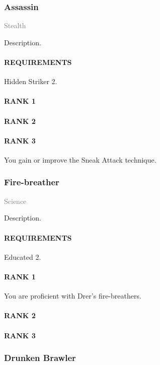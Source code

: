 \subsubsection{Assassin} \label{feat::assassin} %
\small{\textcolor{gray}{Stealth}}

\normalsize
Description.
\paragraph{REQUIREMENTS} Hidden Striker 2.
\paragraph{RANK 1}
\paragraph{RANK 2}
\paragraph{RANK 3} You gain or improve the Sneak Attack technique.

\subsubsection{Fire-breather} \label{feat::firebreather}
\small{\textcolor{gray}{Science}}

\normalsize
Description.
\paragraph{REQUIREMENTS} Educated 2.
\paragraph{RANK 1} You are proficient with Drer's fire-breathers.
\paragraph{RANK 2}
\paragraph{RANK 3}

\subsubsection{Drunken Brawler} \label{feat::drunkenbrawler} %
\small{\textcolor{gray}{}}

